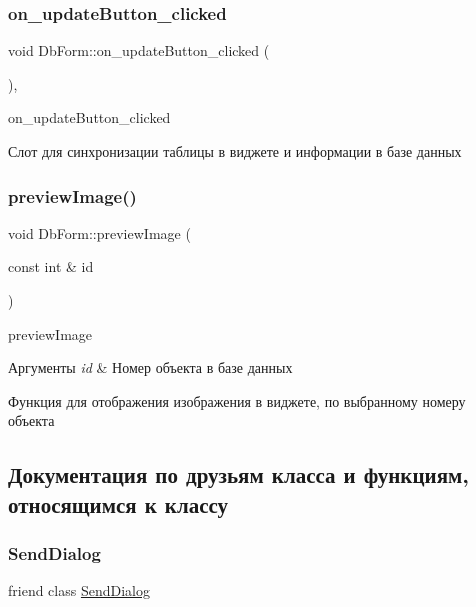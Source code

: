 \subsubsection{\texorpdfstring{on\+\_\+update\+Button\+\_\+clicked}{on\_updateButton\_clicked}}
{\footnotesize\ttfamily void Db\+Form\+::on\+\_\+update\+Button\+\_\+clicked (\begin{DoxyParamCaption}{ }\end{DoxyParamCaption})\hspace{0.3cm}{\ttfamily [private]}, {\ttfamily [slot]}}



on\+\_\+update\+Button\+\_\+clicked 

Слот для синхронизации таблицы в виджете и информации в базе данных \mbox{\label{classDbForm_a56e109480a6bd4556baaf369bc79f99f}} 
\subsubsection{\texorpdfstring{preview\+Image()}{previewImage()}}
{\footnotesize\ttfamily void Db\+Form\+::preview\+Image (\begin{DoxyParamCaption}\item[{const int \&}]{id }\end{DoxyParamCaption})\hspace{0.3cm}{\ttfamily [private]}}



preview\+Image 


\begin{DoxyParams}{Аргументы}
{\em id} & Номер объекта в базе данных\\
\hline
\end{DoxyParams}
Функция для отображения изображения в виджете, по выбранному номеру объекта 

\subsection{Документация по друзьям класса и функциям, относящимся к классу}
\mbox{\label{classDbForm_a6f843022f5255cb942da23ecb29ae451}} 
\subsubsection{\texorpdfstring{Send\+Dialog}{SendDialog}}
{\footnotesize\ttfamily friend class \hyperlink{classSendDialog}{Send\+Dialog}\hspace{0.3cm}{\ttfamily [friend]}}

